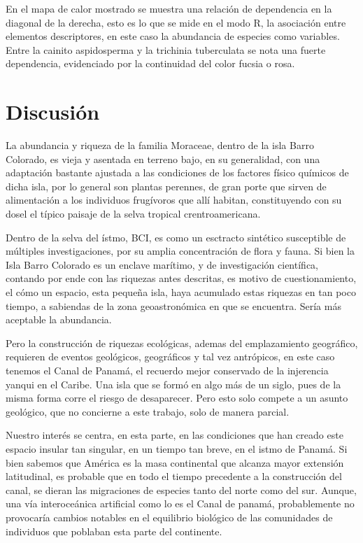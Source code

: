 \documentclass[11pt,]{article}
\begin{document}
En el mapa de calor mostrado se muestra una relación de dependencia en
la diagonal de la derecha, esto es lo que se mide en el modo R, la
asociación entre elementos descriptores, en este caso la abundancia de
especies como variables. Entre la cainito aspidosperma y la trichinia
tuberculata se nota una fuerte dependencia, evidenciado por la
continuidad del color fucsia o rosa.

\section{Discusión}\label{discusiuxf3n}

La abundancia y riqueza de la familia Moraceae, dentro de la isla Barro
Colorado, es vieja y asentada en terreno bajo, en su generalidad, con
una adaptación bastante ajustada a las condiciones de los factores
físico químicos de dicha isla, por lo general son plantas perennes, de
gran porte que sirven de alimentación a los individuos frugívoros que
allí habitan, constituyendo con su dosel el típico paisaje de la selva
tropical crentroamericana.

Dentro de la selva del ístmo, BCI, es como un esctracto sintético
susceptible de múltiples investigaciones, por su amplia concentración de
flora y fauna. Si bien la Isla Barro Colorado es un enclave marítimo, y
de investigación científica, contando por ende con las riquezas antes
descritas, es motivo de cuestionamiento, el cómo un espacio, esta
pequeña isla, haya acumulado estas riquezas en tan poco tiempo, a
sabiendas de la zona geoastronómica en que se encuentra. Sería más
aceptable la abundancia.

Pero la construcción de riquezas ecológicas, ademas del emplazamiento
geográfico, requieren de eventos geológicos, geográficos y tal vez
antrópicos, en este caso tenemos el Canal de Panamá, el recuerdo mejor
conservado de la injerencia yanqui en el Caribe. Una isla que se formó
en algo más de un siglo, pues de la misma forma corre el riesgo de
desaparecer. Pero esto solo compete a un asunto geológico, que no
concierne a este trabajo, solo de manera parcial.

Nuestro interés se centra, en esta parte, en las condiciones que han
creado este espacio insular tan singular, en un tiempo tan breve, en el
istmo de Panamá. Si bien sabemos que América es la masa continental que
alcanza mayor extensión latitudinal, es probable que en todo el tiempo
precedente a la construcción del canal, se dieran las migraciones de
especies tanto del norte como del sur. Aunque, una vía interoceánica
artificial como lo es el Canal de panamá, probablemente no provocaría
cambios notables en el equilibrio biológico de las comunidades de
individuos que poblaban esta parte del continente.
\end{document}
